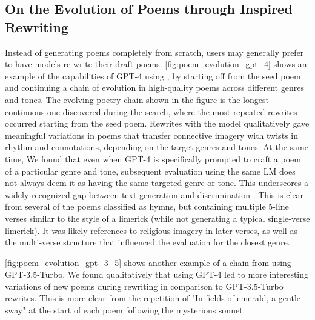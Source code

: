 \subsection{On the Evolution of Poems through Inspired Rewriting}\label{app:discuss_poetry_qdaif_evolution}
Instead of generating poems completely from scratch, users may generally prefer to have models re-write their draft poems. \cref{fig:poem_evolution_gpt_4} shows an example of the capabilities of GPT-4 using \qdaifguided{}, by starting off from the seed poem and continuing a chain of evolution in high-quality poems across different genres and tones. The evolving poetry chain shown in the figure is the longest continuous one discovered during the search, where the most repeated rewrites occurred starting from the seed poem. Rewrites with the model qualitatively gave meaningful variations in poems that transfer connective imagery with twists in rhythm and connotations, depending on the target genres and tones. At the same time, We found that even when GPT-4 is specifically prompted to craft a poem of a particular genre and tone, subsequent evaluation using the same LM does not always deem it as having the same targeted genre or tone. This underscores a widely recognized gap between text generation and discrimination \citep[Page~12]{saunders2022self}. This is clear from several of the poems classified as hymns, but containing multiple 5-line verses similar to the style of a limerick (while not generating a typical single-verse limerick). It was likely references to religious imagery in later verses, as well as the multi-verse structure that influenced the evaluation for the closest genre.

\cref{fig:poem_evolution_gpt_3_5} shows another example of a chain from using GPT-3.5-Turbo. We found qualitatively that using GPT-4 led to more interesting variations of new poems during rewriting in comparison to GPT-3.5-Turbo rewrites. This is more clear from the repetition of "In fields of emerald, a gentle sway" at the start of each poem following the mysterious sonnet. 

